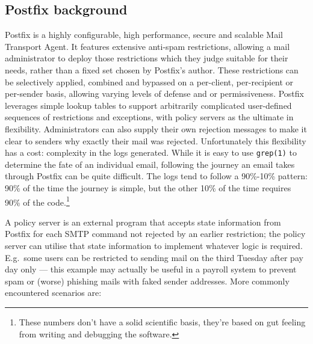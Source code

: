 \documentclass[a4paper,12pt,draft]{article}
\begin{document}
\subsection{Postfix background}

Postfix is a highly configurable, high performance, secure and scalable
Mail Transport Agent.  It features extensive anti-spam restrictions,
allowing a mail administrator to deploy those restrictions which they judge
suitable for their needs, rather than a fixed set chosen by Postfix's
author.  These restrictions can be selectively applied, combined and
bypassed on a per-client, per-recipient or per-sender basis, allowing
varying levels of defense and or permissiveness.  Postfix leverages simple
lookup tables to support arbitrarily complicated user-defined sequences of
restrictions and exceptions, with policy servers as the ultimate in
flexibility.  Administrators can also supply their own rejection messages
to make it clear to senders why exactly their mail was rejected.
Unfortunately this flexibility has a cost: complexity in the logs
generated.  While it is easy to use \texttt{grep(1)} to determine the fate
of an individual email, following the journey an email takes through
Postfix can be quite difficult.  The logs tend to follow a 90\%-10\%
pattern: 90\% of the time the journey is simple, but the other 10\% of the
time requires 90\% of the code.\footnote{These numbers don't have a solid
scientific basis, they're based on gut feeling from writing and debugging
the software.}

A policy server is an external program that accepts state information from
Postfix for each SMTP command not rejected by an earlier restriction; the
policy server can utilise that state information to implement whatever
logic is required.  E.g.\ some users can be restricted to sending mail on
the third Tuesday after pay day only --- this example may actually be
useful in a payroll system to prevent spam or (worse) phishing mails with
faked sender addresses.  More commonly encountered scenarios are:
\end{document}
